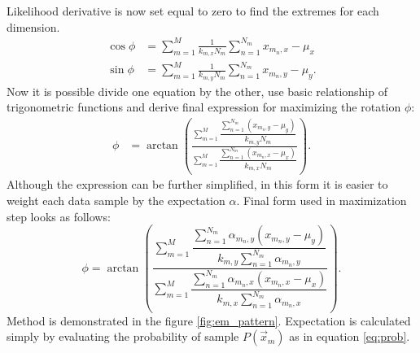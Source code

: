 Likelihood derivative is now set equal to zero to find the extremes for each dimension.
\begin{align}
\cos \phi &= \sum_{m=1}^{M} \frac{1}{k_{m, x}N_m} \sum_{n = 1}^{N_m} x_{m_n, x} - \mu_x \\ 
\sin \phi &= \sum_{m=1}^{M} \frac{1}{k_{m, y}N_m} \sum_{n = 1}^{N_m} x_{m_n, y} - \mu_y .
\end{align}
Now it is possible divide one equation by the other, use basic relationship of trigonometric functions and derive final expression for maximizing the rotation $\phi$:
\begin{align}
\phi &= \arctan \left( \frac{\sum_{m=1}^{M} \dfrac{\sum_{n = 1}^{N_m} \left( x_{m_n, y} - \mu_y \right)}{k_{m, y}N_m} }{\sum_{m=1}^{M} \dfrac{\sum_{n = 1}^{N_m} \left( x_{m_n, x} - \mu_x \right)}{k_{m, x}N_m} }\right).
\label{eq:prob}
\end{align}
Although the expression can be further simplified, in this form it is easier to weight each data sample by the expectation $\alpha$. Final form used in maximization step looks as follows:
\begin{equation}
\phi = \arctan \left( \dfrac{\sum_{m=1}^{M} \dfrac{\sum_{n = 1}^{N_m} \alpha_{m_n, y}(x_{m_n, y} - \mu_y)}{k_{m, y}\sum_{n = 1}^{N_m} \alpha_{m_n, y}} }{\sum_{m=1}^{M} \dfrac{\sum_{n = 1}^{N_m} \alpha_{m_n, x} (x_{m_n, x} - \mu_x) }{k_{m, x}\sum_{n = 1}^{N_m} \alpha_{m_n, x}} }\right).
\end{equation}
Method is demonstrated in the figure \ref{fig:em_pattern}. Expectation is calculated simply by evaluating the probability of sample $P(\vec{x}_m)$ as in equation \ref{eq:prob}.

